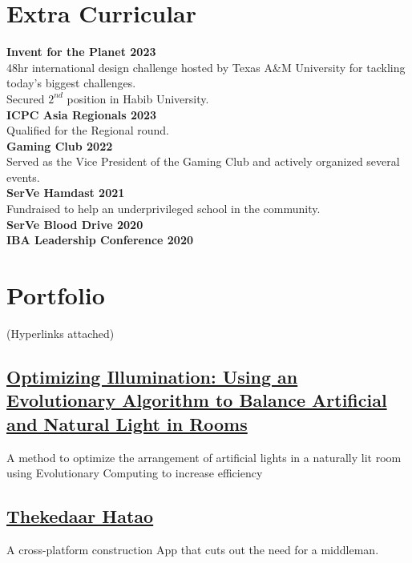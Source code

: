 \documentclass[]{resume}
\begin{document}
\begin{minipage}[t]{0.39\textwidth} 




\section{Extra Curricular}
\textbf{Invent for the Planet 2023}\\
48hr international design challenge hosted by Texas A\&M University for tackling today's biggest challenges. \\
Secured $2^{nd}$ position in Habib University. \\
\textbf{ICPC Asia Regionals 2023}\\
Qualified for the Regional round. \\ 
\textbf{Gaming Club 2022}\\
Served as the Vice President of the Gaming Club and actively organized several events. \\ 
\textbf{SerVe Hamdast 2021}\\
Fundraised to help an underprivileged school in the community. \\ 
\textbf{SerVe Blood Drive 2020}\\
\textbf{IBA Leadership Conference 2020}\\



\section{Portfolio}
    (Hyperlinks attached)\\

    \subsection{\href{https://github.com/aliasgharchakera/CI-Spring23-Project}{\textbf{Optimizing Illumination: Using an Evolutionary
Algorithm to Balance Artificial and Natural Light in
Rooms}}}%
    A method to optimize the arrangement of artificial lights in a naturally lit room using Evolutionary Computing to increase efficiency

    \subsection{\href{https://github.com/aliasgharchakera/SE-Spring23-Project}{\textbf{Thekedaar Hatao}}}%
    A cross-platform construction App that cuts out the need for a middleman.


\end{minipage}
\end{document}

